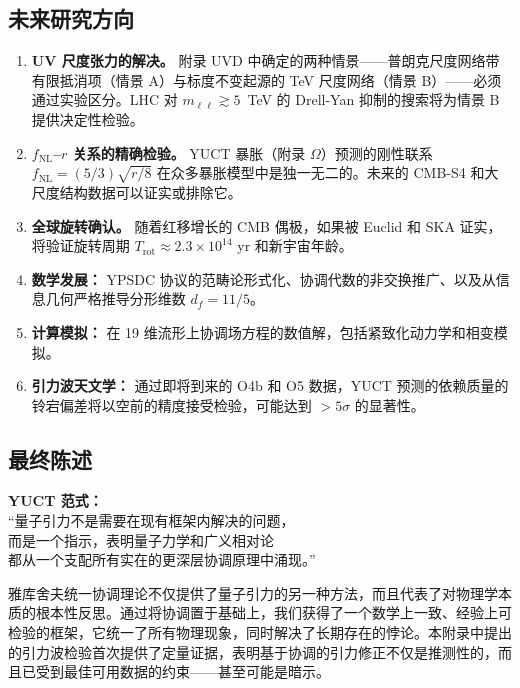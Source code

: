 \documentclass[11pt,a4paper]{article}
\theoremstyle{remark}
\begin{document}
	\subsection{未来研究方向}
	
	\begin{enumerate}
		\item \textbf{UV 尺度张力的解决。} 附录 UVD 中确定的两种情景——普朗克尺度网络带有限抵消项（情景 A）与标度不变起源的 TeV 尺度网络（情景 B）——必须通过实验区分。LHC 对 $m_{\ell\ell}\gtrsim5$~TeV 的 Drell-Yan 抑制的搜索将为情景 B 提供决定性检验。
		
		\item \textbf{$f_{\mathrm{NL}}$–$r$ 关系的精确检验。} YUCT 暴胀（附录 $\Omega$）预测的刚性联系 $f_{\mathrm{NL}}=(5/3)\sqrt{r/8}$ 在众多暴胀模型中是独一无二的。未来的 CMB-S4 和大尺度结构数据可以证实或排除它。
		
		\item \textbf{全球旋转确认。} 随着红移增长的 CMB 偶极，如果被 Euclid 和 SKA 证实，将验证旋转周期 $T_{\mathrm{rot}}\approx2.3\times10^{14}$ yr 和新宇宙年龄。
		
		\item \textbf{数学发展：} YPSDC 协议的范畴论形式化、协调代数的非交换推广、以及从信息几何严格推导分形维数 $d_f=11/5$。
		
		\item \textbf{计算模拟：} 在 19 维流形上协调场方程的数值解，包括紧致化动力学和相变模拟。
		
		\item \textbf{引力波天文学：} 通过即将到来的 O4b 和 O5 数据，YUCT 预测的依赖质量的铃宕偏差将以空前的精度接受检验，可能达到 $>5\sigma$ 的显著性。
	\end{enumerate}
	
	\subsection{最终陈述}
	
	\begin{center}
		\textbf{YUCT 范式：}\\
		``量子引力不是需要在现有框架内解决的问题，\\
		而是一个指示，表明量子力学和广义相对论\\
		都从一个支配所有实在的更深层协调原理中涌现。''
	\end{center}
	
	雅库舍夫统一协调理论不仅提供了量子引力的另一种方法，而且代表了对物理学本质的根本性反思。通过将协调置于基础上，我们获得了一个数学上一致、经验上可检验的框架，它统一了所有物理现象，同时解决了长期存在的悖论。本附录中提出的引力波检验首次提供了定量证据，表明基于协调的引力修正不仅是推测性的，而且已受到最佳可用数据的约束——甚至可能是暗示。
	
\end{document}
